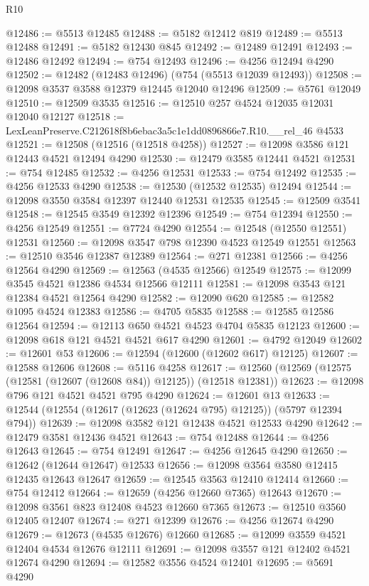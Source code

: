 \begin{lexlean}{R10}
\begin{coremodule}
@12486 := @5513 @12485
@12488 := @5182 @12412 @819
@12489 := @5513 @12488
@12491 := @5182 @12430 @845
@12492 := @12489 @12491
@12493 := @12486 @12492
@12494 := @754 @12493
@12496 := @4256 @12494 @4290
@12502 := @12482 (@12483 @12496) (@754 (@5513 @12039 @12493))
@12508 := @12098 @3537 @3588 @12379 @12445 @12040 @12496
@12509 := @5761 @12049
@12510 := @12509 @3535
@12516 := @12510 @257 @4524 @12035 @12031 @12040 @12127
@12518 := LexLeanPreserve.C212618f8b6ebac3a5c1e1dd0896866e7.R10.__rel_46 @4533
@12521 := @12508 (@12516 (@12518 @4258))
@12527 := @12098 @3586 @121 @12443 @4521 @12494 @4290
@12530 := @12479 @3585 @12441 @4521
@12531 := @754 @12485
@12532 := @4256 @12531
@12533 := @754 @12492
@12535 := @4256 @12533 @4290
@12538 := @12530 (@12532 @12535) @12494
@12544 := @12098 @3550 @3584 @12397 @12440 @12531 @12535
@12545 := @12509 @3541
@12548 := @12545 @3549 @12392 @12396
@12549 := @754 @12394
@12550 := @4256 @12549
@12551 := @7724 @4290
@12554 := @12548 (@12550 @12551) @12531
@12560 := @12098 @3547 @798 @12390 @4523 @12549 @12551
@12563 := @12510 @3546 @12387 @12389
@12564 := @271 @12381
@12566 := @4256 @12564 @4290
@12569 := @12563 (@4535 @12566) @12549
@12575 := @12099 @3545 @4521 @12386 @4534 @12566 @12111
@12581 := @12098 @3543 @121 @12384 @4521 @12564 @4290
@12582 := @12090 @620
@12585 := @12582 @1095 @4524 @12383
@12586 := @4705 @5835
@12588 := @12585 @12586 @12564
@12594 := @12113 @650 @4521 @4523 @4704 @5835 @12123
@12600 := @12098 @618 @121 @4521 @4521 @617 @4290
@12601 := @4792 @12049
@12602 := @12601 @53
@12606 := @12594 (@12600 (@12602 @617) @12125)
@12607 := @12588 @12606
@12608 := @5116 @4258
@12617 := @12560 (@12569 (@12575 (@12581 (@12607 (@12608 @84)) @12125)) (@12518 @12381))
@12623 := @12098 @796 @121 @4521 @4521 @795 @4290
@12624 := @12601 @13
@12633 := @12544 (@12554 (@12617 (@12623 (@12624 @795) @12125)) (@5797 @12394 @794))
@12639 := @12098 @3582 @121 @12438 @4521 @12533 @4290
@12642 := @12479 @3581 @12436 @4521
@12643 := @754 @12488
@12644 := @4256 @12643
@12645 := @754 @12491
@12647 := @4256 @12645 @4290
@12650 := @12642 (@12644 @12647) @12533
@12656 := @12098 @3564 @3580 @12415 @12435 @12643 @12647
@12659 := @12545 @3563 @12410 @12414
@12660 := @754 @12412
@12664 := @12659 (@4256 @12660 @7365) @12643
@12670 := @12098 @3561 @823 @12408 @4523 @12660 @7365
@12673 := @12510 @3560 @12405 @12407
@12674 := @271 @12399
@12676 := @4256 @12674 @4290
@12679 := @12673 (@4535 @12676) @12660
@12685 := @12099 @3559 @4521 @12404 @4534 @12676 @12111
@12691 := @12098 @3557 @121 @12402 @4521 @12674 @4290
@12694 := @12582 @3556 @4524 @12401
@12695 := @5691 @4290

\end{coremodule}
\end{lexlean}
